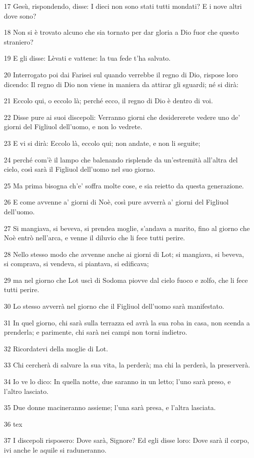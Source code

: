 \par 17 Gesù, rispondendo, disse: I dieci non sono stati tutti mondati? E i nove altri dove sono?
\par 18 Non si è trovato alcuno che sia tornato per dar gloria a Dio fuor che questo straniero?
\par 19 E gli disse: Lèvati e vattene: la tua fede t'ha salvato.
\par 20 Interrogato poi dai Farisei sul quando verrebbe il regno di Dio, rispose loro dicendo: Il regno di Dio non viene in maniera da attirar gli sguardi; né si dirà:
\par 21 Eccolo qui, o eccolo là; perché ecco, il regno di Dio è dentro di voi.
\par 22 Disse pure ai suoi discepoli: Verranno giorni che desidererete vedere uno de' giorni del Figliuol dell'uomo, e non lo vedrete.
\par 23 E vi si dirà: Eccolo là, eccolo qui; non andate, e non li seguite;
\par 24 perché com'è il lampo che balenando risplende da un'estremità all'altra del cielo, così sarà il Figliuol dell'uomo nel suo giorno.
\par 25 Ma prima bisogna ch'e' soffra molte cose, e sia reietto da questa generazione.
\par 26 E come avvenne a' giorni di Noè, così pure avverrà a' giorni del Figliuol dell'uomo.
\par 27 Si mangiava, si beveva, si prendea moglie, s'andava a marito, fino al giorno che Noè entrò nell'arca, e venne il diluvio che li fece tutti perire.
\par 28 Nello stesso modo che avvenne anche ai giorni di Lot; si mangiava, si beveva, si comprava, si vendeva, si piantava, si edificava;
\par 29 ma nel giorno che Lot uscì di Sodoma piovve dal cielo fuoco e zolfo, che li fece tutti perire.
\par 30 Lo stesso avverrà nel giorno che il Figliuol dell'uomo sarà manifestato.
\par 31 In quel giorno, chi sarà sulla terrazza ed avrà la sua roba in casa, non scenda a prenderla; e parimente, chi sarà nei campi non torni indietro.
\par 32 Ricordatevi della moglie di Lot.
\par 33 Chi cercherà di salvare la sua vita, la perderà; ma chi la perderà, la preserverà.
\par 34 Io ve lo dico: In quella notte, due saranno in un letto; l'uno sarà preso, e l'altro lasciato.
\par 35 Due donne macineranno assieme; l'una sarà presa, e l'altra lasciata.
\par 36 tex
\par 37 I discepoli risposero: Dove sarà, Signore? Ed egli disse loro: Dove sarà il corpo, ivi anche le aquile si raduneranno.

